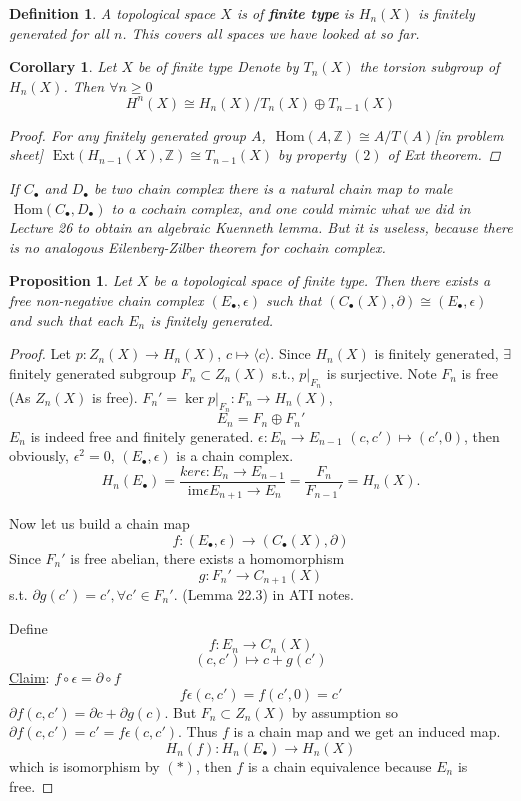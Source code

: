 \documentclass[11pt]{article}
\newtheorem{prop}[thm]{Proposition}
\newtheorem{cor}[thm]{Corollary}
\newtheorem{dfn}[thm]{Definition}
\renewcommand{\hom}{\text{ Hom}}
\newcommand{\im}{\text{ im}}
\newcommand{\ext}{\text{ Ext}}
\newcommand{\intg}{\mathbb Z}
\newcommand{\pd}{\partial}
\newcommand{\lrta}{\longrightarrow}
\newcommand{\lgl}{\langle}
\newcommand{\rgl}{\rangle}
\begin{document}
\begin{dfn}
A topological space $X$ is of \textbf{finite type} is $H_n(X)$ is finitely generated for all $n$. This covers all spaces we have looked at so far.
\end{dfn}
\begin{cor}
Let $X$  be of finite type  Denote  by $T_n(X)$ the torsion subgroup of $H_n(X)$. Then $\forall n\geq 0$
$$
H^n(X)\cong H_n(X)/T_n(X)\oplus T_{n-1}(X)
$$ 
\begin{proof}
For any finitely generated group  $A$, $\hom(A,\intg)\cong A/T(A)$[in problem sheet]
$\ext(H_{n-1}(X),\intg)\cong T_{n-1}(X)$ by property $(2)$ of Ext theorem.
\end{proof}
If $C_\bullet$ and $D_\bullet$ be two chain complex there is a natural chain map to male $\hom(C_\bullet, D_\bullet)$ to a cochain complex, and one could mimic what we did in Lecture 26 to obtain an algebraic  Kuenneth lemma. But it is useless, because there is no analogous Eilenberg-Zilber theorem for cochain complex.
\end{cor}

\begin{prop}
Let $X$ be a topological space of finite type. Then there exists a free non-negative chain complex $(E_\bullet,\epsilon )$ such that $(C_\bullet(X),\pd)\cong (E_\bullet,\epsilon)$ and such that each $E_n$ is finitely generated.
\end{prop}
\begin{proof}
Let $p:Z_n(X)\lrta H_n(X)$, $c\mapsto \lgl c\rgl$. Since $H_n(X)$ is finitely generated, $\exists$ finitely generated subgroup $F_n\subset Z_n(X)$ s.t., $p|_{F_n}$  is surjective. Note $F_n$ is free (As $Z_n(X)$ is free). $F_n'=\ker p|_{F_n}:F_n\lrta H_n(X)$, 
$$
E_n=F_n\oplus F_n'
$$
$E_n$ is indeed free and finitely generated.
$\epsilon: E_n\lrta E_{n-1} $ $(c,c')\mapsto (c',0)$, then obviously, $\epsilon^2=0$, $(E_\bullet,\epsilon)$ is a chain complex.
\begin{equation}\tag{*}
H_n(E_\bullet)=\frac{ker \epsilon :E_n\lrta E_{n-1}}{\im \epsilon E_{n+1}\lrta E_n}=\frac{F_n}{F_{n-1}'}=H_n(X).
\end{equation}

Now let us build a chain map $$
f:(E_\bullet, \epsilon)\lrta (C_\bullet(X),\pd)
$$
Since $F_n'$ is free abelian, there exists a homomorphism
$$
g: F_n'\lrta C_{n+1}(X)
$$
s.t. $\pd g(c')=c',\forall c'\in F_n'$. (Lemma 22.3) in ATI notes.

Define 
$$
f: E_n\lrta C_n(X)
$$
$$
(c,c')\longmapsto c+ g(c')
$$
\underline{Claim}: $f\circ \epsilon=\pd \circ f$
$$
f\epsilon (c,c')=f(c',0)=c'
$$
$\pd f(c,c')=\pd c+\pd g(c)$. But $F_n\subset Z_n(X)$ by assumption so $\pd f(c,c')=c'=f\epsilon(c,c')$. Thus $f$ is a chain map and we get an induced map.
$$
H_n(f): H_n(E_\bullet)\lrta H_n(X)
$$
which is isomorphism by $(*)$, then $f$ is a chain equivalence because $E_n$ is free.

\end{proof}
\end{document}
